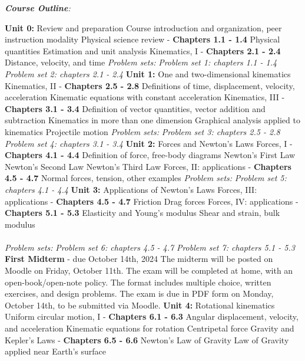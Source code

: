 \documentclass[10pt]{article}
\begin{document}
\clearpage
\twocolumn
\noindent
\textit{\textbf{Course Outline}:}
\begin{outline}[enumerate]
\1 \textbf{Unit 0:} Review and preparation 
\2 Course introduction and organization, peer instruction modality
\2 Physical science review - \textbf{Chapters 1.1 - 1.4}
\3 Physical quantities
\3 Estimation and unit analysis
\2 Kinematics, I - \textbf{Chapters 2.1 - 2.4}
\3 Distance, velocity, and time
\2 \textit{Problem sets:}
\3 \textit{Problem set 1: chapters 1.1 - 1.4}
\3 \textit{Problem set 2: chapters 2.1 - 2.4}
\1 \textbf{Unit 1:} One and two-dimensional kinematics
\2 Kinematics, II - \textbf{Chapters 2.5 - 2.8}
\3 Definitions of time, displacement, velocity, acceleration
\3 Kinematic equations with constant acceleration
\2 Kinematics, III - \textbf{Chapters 3.1 - 3.4}
\3 Definition of vector quantities, vector addition and subtraction
\3 Kinematics in more than one dimension
\3 Graphical analysis applied to kinematics
\3 Projectile motion
\2 \textit{Problem sets:}
\3 \textit{Problem set 3: chapters 2.5 - 2.8}
\3 \textit{Problem set 4: chapters 3.1 - 3.4}
\1 \textbf{Unit 2:} Forces and Newton's Laws
\2 Forces, I - \textbf{Chapters 4.1 - 4.4}
\3 Definition of force, free-body diagrams
\3 Newton's First Law
\3 Newton's Second Law
\3 Newton's Third Law
\2 Forces, II: applications - \textbf{Chapters 4.5 - 4.7}
\3 Normal forces, tension, other examples
\2 \textit{Problem sets:}
\3 \textit{Problem set 5: chapters 4.1 - 4.4}
\1 \textbf{Unit 3:} Applications of Newton's Laws
\2 Forces, III: applications - \textbf{Chapters 4.5 - 4.7}
\3 Friction
\3 Drag forces
\2 Forces, IV: applications - \textbf{Chapters 5.1 - 5.3}
\3 Elasticity and Young's modulus
\3 Shear and strain, bulk modulus \\ \\
\2 \textit{Problem sets:}
\3 \textit{Problem set 6: chapters 4.5 - 4.7}
\3 \textit{Problem set 7: chapters 5.1 - 5.3}
\1 \textbf{First Midterm} - due October 14th, 2024
\2 The midterm will be posted on Moodle on Friday, October 11th.
\2 The exam will be completed at home, with an open-book/open-note policy.  The format includes multiple choice, written exercises, and design problems.
\2 The exam is due in PDF form on Monday, October 14th, to be submitted via Moodle.
\1 \textbf{Unit 4:} Rotational kinematics
\2 Uniform circular motion, I - \textbf{Chapters 6.1 - 6.3}
\3 Angular displacement, velocity, and acceleration
\3 Kinematic equations for rotation
\3 Centripetal force
\2 Gravity and Kepler's Laws - \textbf{Chapters 6.5 - 6.6}
\3 Newton's Law of Gravity
\3 Law of Gravity applied near Earth's surface

\end{outline}
\end{document}
